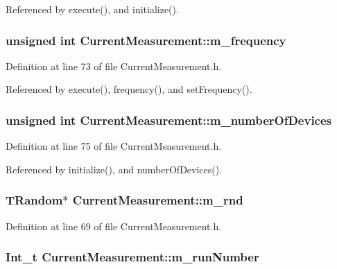 Referenced by execute(), and initialize().\hypertarget{classCurrentMeasurement_a66e12903825632c0434e3b7cf929a960}{
\subsubsection[{m\_\-frequency}]{\setlength{\rightskip}{0pt plus 5cm}unsigned int {\bf CurrentMeasurement::m\_\-frequency}}}
\label{classCurrentMeasurement_a66e12903825632c0434e3b7cf929a960}


Definition at line 73 of file CurrentMeasurement.h.

Referenced by execute(), frequency(), and setFrequency().\hypertarget{classCurrentMeasurement_a073f6aba41750712d620e60e346f2315}{
\subsubsection[{m\_\-numberOfDevices}]{\setlength{\rightskip}{0pt plus 5cm}unsigned int {\bf CurrentMeasurement::m\_\-numberOfDevices}}}
\label{classCurrentMeasurement_a073f6aba41750712d620e60e346f2315}


Definition at line 75 of file CurrentMeasurement.h.

Referenced by initialize(), and numberOfDevices().\hypertarget{classCurrentMeasurement_ac0c595b78b8110a19b59a333a6c27c1b}{
\subsubsection[{m\_\-rnd}]{\setlength{\rightskip}{0pt plus 5cm}TRandom$\ast$ {\bf CurrentMeasurement::m\_\-rnd}}}
\label{classCurrentMeasurement_ac0c595b78b8110a19b59a333a6c27c1b}


Definition at line 69 of file CurrentMeasurement.h.\hypertarget{classCurrentMeasurement_a5a7bfe59821148e4e9e2998c73b635a8}{
\subsubsection[{m\_\-runNumber}]{\setlength{\rightskip}{0pt plus 5cm}Int\_\-t {\bf CurrentMeasurement::m\_\-runNumber}}}
\label{classCurrentMeasurement_a5a7bfe59821148e4e9e2998c73b635a8}


